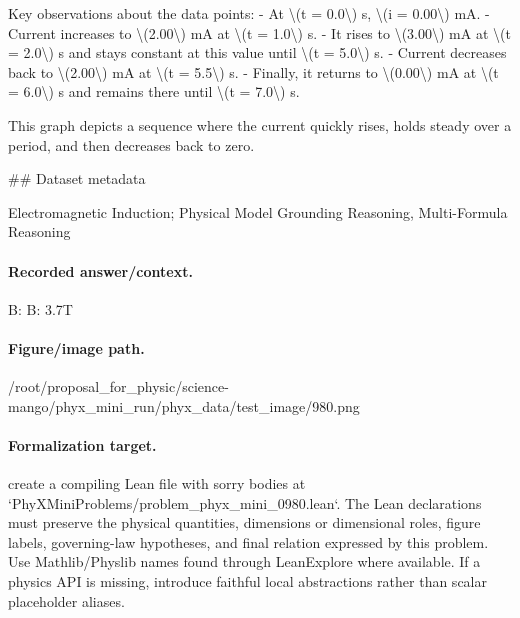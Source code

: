 Key observations about the data points:
- At \textbackslash{}(t = 0.0\textbackslash{}) s, \textbackslash{}(i = 0.00\textbackslash{}) mA.
- Current increases to \textbackslash{}(2.00\textbackslash{}) mA at \textbackslash{}(t = 1.0\textbackslash{}) s.
- It rises to \textbackslash{}(3.00\textbackslash{}) mA at \textbackslash{}(t = 2.0\textbackslash{}) s and stays constant at this value until \textbackslash{}(t = 5.0\textbackslash{}) s.
- Current decreases back to \textbackslash{}(2.00\textbackslash{}) mA at \textbackslash{}(t = 5.5\textbackslash{}) s.
- Finally, it returns to \textbackslash{}(0.00\textbackslash{}) mA at \textbackslash{}(t = 6.0\textbackslash{}) s and remains there until \textbackslash{}(t = 7.0\textbackslash{}) s.

This graph depicts a sequence where the current quickly rises, holds steady over a period, and then decreases back to zero.

\#\# Dataset metadata

Electromagnetic Induction; Physical Model Grounding Reasoning, Multi-Formula Reasoning

\paragraph{Recorded answer/context.}
B: B: 3.7T

\paragraph{Figure/image path.}
/root/proposal\_for\_physic/science-mango/phyx\_mini\_run/phyx\_data/test\_image/980.png

\paragraph{Formalization target.}
create a compiling Lean file with sorry bodies at `PhyXMiniProblems/problem\_phyx\_mini\_0980.lean`. The Lean declarations must preserve the physical quantities, dimensions or dimensional roles, figure labels, governing-law hypotheses, and final relation expressed by this problem.
Use Mathlib/Physlib names found through LeanExplore where available. If a physics API is missing, introduce faithful local abstractions rather than scalar placeholder aliases.


